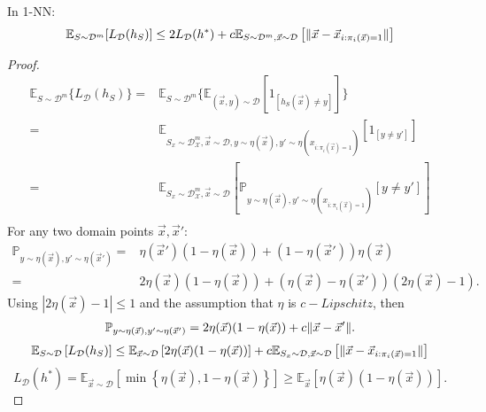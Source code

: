\begin{lemma}
    In {1-NN}:
    \[
        \mathbb{E}_{S \sim \mathcal{D}^m} [L_{\mathcal{D}}(h_S)] \le 2 L_{\mathcal{D}}(h^*) + c \mathbb{E}_{S \sim \mathcal{D}^m, \vec{x} \sim \mathcal{D}} \left[ \Arrowvert \vec{x} - \vec{x}_{i:\pi_i(\vec{x}) = 1} \Arrowvert \right]
    \]
    \begin{proof}
        \begin{align*}
            \mathbb{E}_{S\sim \mathcal{D}^m}\{L_{\mathcal{D}}(h_S)\} =& \mathbb{E}_{S \sim \mathcal{D}^m} \{\mathbb{E}_{(\vec{x}, y)\sim \mathcal{D}} [1_{[h_S(\vec{x}) \ne y]}] \} \\
            =& \mathbb{E}_{S_x \sim \mathcal{D}^m_{\mathcal{X}}, \vec{x}\sim\mathcal{D}, y\sim\eta(\vec{x}), y' \sim \eta(x_{i:\pi_i(\vec{x}) = 1})} \left[ 1_{\left[ y\ne y' \right]} \right]\\
            =& \mathbb{E}_{S_x \sim \mathcal{D}^m_{\mathcal{X}}, \vec{x}\sim\mathcal{D}} \left[ \mathbb{P}_{y \sim \eta(\vec{x}), y' \sim \eta(x_{i:\pi_i(\vec{x})=1})} \left[ y \ne y' \right] \right]\\
        \end{align*}
        For any two domain points $ \vec{x}, \vec{x}' $:
        \begin{align*}
            \mathbb{P}_{y \sim \eta(\vec{x}), y' \sim \eta(\vec{x}')} 
            =& \eta(\vec{x}') (1 - \eta(\vec{x})) + (1 - \eta(\vec{x}')) \eta(\vec{x})\\
            =& 2 \eta(\vec{x})(1 - \eta(\vec{x})) + (\eta(\vec{x}) - \eta(\vec{x}')) (2\eta(\vec{x}) - 1).
        \end{align*}
        Using $ \left| 2\eta(\vec{x}) - 1 \right| \le 1 $ and the assumption that $ \eta $ is $ c-Lipschitz $, then
        \begin{align*}
            \mathbb{P}_{y \sim \eta(\vec{x}), y' \sim \eta(\vec{x}')} 
            = 2 \eta(\vec{x})(1 - \eta(\vec{x})) + c \Arrowvert \vec{x} - \vec{x}' \Arrowvert.
        \end{align*}
        \[
            \mathbb{E}_{S \sim \mathcal{D}} \left[ L_{\mathcal{D}}(h_S) \right] \le \mathbb{E}_{\vec{x} \sim \mathcal{D}} \left[ 2\eta(\vec{x})(1-\eta(\vec{x})) \right] + c \mathbb{E}_{S_x \sim \mathcal{D}, \vec{x} \sim \mathcal{D}} \left[ \Arrowvert \vec{x} - \vec{x}_{i:\pi_i(\vec{x}) = 1} \Arrowvert \right]
        \]
        \[
            L_{\mathcal{D}}(h^*) = \mathbb{E}_{\vec{x}\sim \mathcal{D}} \left[ \min \left\{ \eta(\vec{x}), 1-\eta(\vec{x}) \right\} \right] \ge \mathbb{E}_{\vec{x}} \left[ \eta(\vec{x})(1 - \eta(\vec{x})) \right].
        \]
    \end{proof}
\end{lemma}

